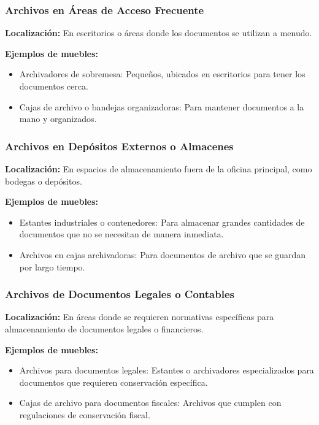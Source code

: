 \documentclass{article}
\begin{document}
\subsubsection{Archivos en Áreas de Acceso Frecuente}

\textbf{Localización:} En escritorios o áreas donde los documentos se utilizan a menudo.

\textbf{Ejemplos de muebles:}

\begin{itemize}
    \item   Archivadores de sobremesa: Pequeños, ubicados en escritorios para tener los documentos cerca.
    \item   Cajas de archivo o bandejas organizadoras: Para mantener documentos a la mano y organizados.
\end{itemize}

\subsubsection{Archivos en Depósitos Externos o Almacenes}

\textbf{Localización:} En espacios de almacenamiento fuera de la oficina principal, como bodegas o depósitos.

\textbf{Ejemplos de muebles:}

\begin{itemize}
    \item   Estantes industriales o contenedores: Para almacenar grandes cantidades de documentos que no se necesitan de manera inmediata.
    \item   Archivos en cajas archivadoras: Para documentos de archivo que se guardan por largo tiempo.
\end{itemize}

\subsubsection{Archivos de Documentos Legales o Contables}

\textbf{Localización:} En áreas donde se requieren normativas específicas para almacenamiento de documentos legales o financieros.

\textbf{Ejemplos de muebles:}

\begin{itemize}
    \item   Archivos para documentos legales: Estantes o archivadores especializados para documentos que requieren conservación específica.
    \item   Cajas de archivo para documentos fiscales: Archivos que cumplen con regulaciones de conservación fiscal.
\end{itemize}
\end{document}
